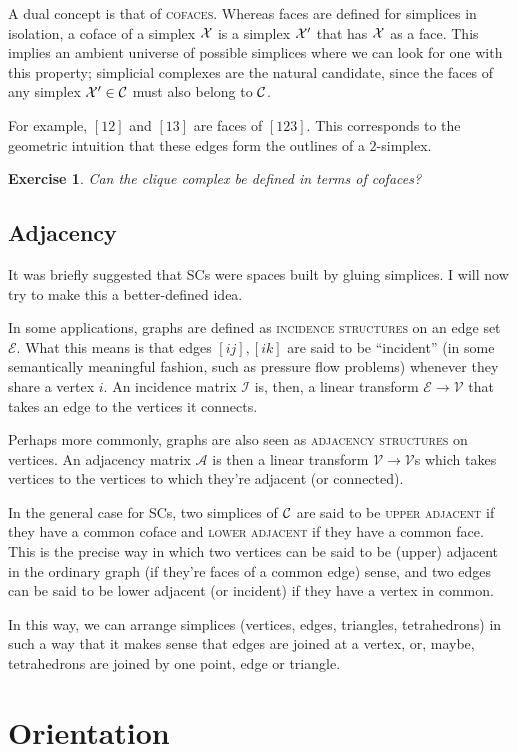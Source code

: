 \documentclass{tufte-handout}
\newtheorem{exercise}{Exercise}
\newcommand{\define}{\textsc}
\newcommand{\ve}{\mathcal{V}}
\begin{document}
A dual concept is that of \define{cofaces}. Whereas faces are defined for simplices in isolation, a coface of a simplex $\se$ is a simplex $\se'$ that has $\se$ as a face. This implies an ambient universe of possible simplices where we can look for one with this property; simplicial complexes are the natural candidate, since the faces of any simplex $\se'\in \sc$ must also belong to $\sc$. 

For example, $[12]$ and $[13]$ are faces of $[123]$. This corresponds to the geometric intuition that these edges form the outlines of a $2$-simplex.
\begin{exercise}
Can the clique complex be defined in terms of cofaces?
\end{exercise}


\subsection{Adjacency}

It was briefly suggested that SCs were spaces built by gluing simplices. I will now try to make this a better-defined idea.

In some applications, graphs are defined as \define{incidence structures} on an edge set $\mathcal E$. What this means is that edges $[ij],[ik]$ are said to be ``incident'' (in some semantically meaningful fashion, such as pressure flow problems) whenever they share a vertex $i$. An incidence matrix $\mathcal I$ is, then, a linear transform $\mathcal E\to \ve$ that takes an edge to the vertices it connects.

Perhaps more commonly, graphs are also seen as \define{adjacency structures} on vertices. An adjacency matrix $\mathcal A$ is then a linear transform $\ve\to \ve$s which takes vertices to the vertices to which they're adjacent (or connected). 


In the general case for SCs, two simplices of $\sc$ are said to be \define{upper adjacent} if they have a common coface and \define{lower adjacent} if they have a common face. This is the precise way in which two vertices can be said to be (upper) adjacent in the ordinary graph (if they're faces of a common edge) sense, and two edges can be said to be lower adjacent (or incident) if they have a vertex in common.

In this way, we can arrange simplices (vertices, edges, triangles, tetrahedrons) in such a way that it makes sense that edges are joined at a vertex, or, maybe, tetrahedrons are joined by one point, edge or triangle. 
\section{Orientation}
\end{document}
